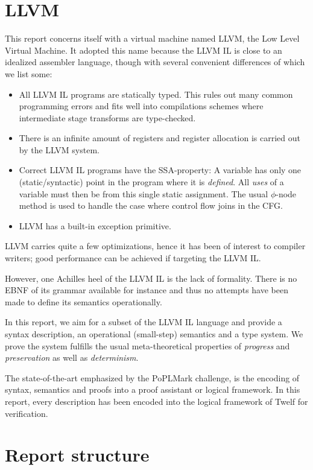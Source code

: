 \documentclass[a4paper, oneside, 10pt, draft]{memoir}
\begin{document}
\section{LLVM}

This report concerns itself with a virtual machine named LLVM, the Low
Level Virtual Machine. It adopted this name because the LLVM IL is
close to an idealized assembler language, though with several
convenient differences of which we list some:
\begin{itemize}
\item All LLVM IL programs are statically typed. This rules out many
  common programming errors and fits well into compilations schemes
  where intermediate stage transforms are type-checked.
\item There is an infinite amount of registers and register allocation
  is carried out by the LLVM system.
\item Correct LLVM IL programs have the SSA-property: A variable has
  only one (static/syntactic) point in the program where it is
  \emph{defined}. All \emph{uses} of a variable must then be from this
  single static assignment. The usual $\phi$-node method is used to
  handle the case where control flow joins in the CFG.
\item LLVM has a built-in exception primitive.
\end{itemize}

LLVM carries quite a few optimizations, hence it has been of interest
to compiler writers; good performance can be achieved if targeting the
LLVM IL.

However, one Achilles heel of the LLVM IL is the lack of
formality. There is no EBNF of its grammar available for instance and
thus no attempts have been made to define its semantics operationally.

In this report, we aim for a subset of the LLVM IL language and
provide a syntax description, an operational (small-step) semantics and a type
system. We prove the system fulfills the usual meta-theoretical
properties of \emph{progress} and \emph{preservation} as well as
\emph{determinism}.

The state-of-the-art emphasized by the PoPLMark challenge,
is the encoding of syntax, semantics and proofs into a proof assistant
or logical framework. In this report, every description has been
encoded into the logical framework of Twelf for
verification.

\section{Report structure}
\end{document}
